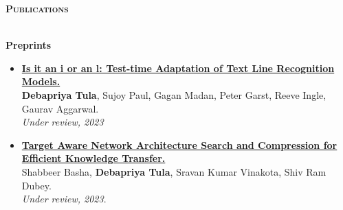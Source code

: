 \documentclass[10pt]{article}
\renewcommand{\section}[1]{
\bigskip
  \begin{Large}
  {\textsc{\textbf{#1}}}
  \end{Large}
  \hrulefill
  \medskip
  \\
}
\begin{document}
\section{Publications}
\label{sec:pubs}
\textbf{\large{Preprints}}\hfill
\begin{itemize}
    \item \href{https://arxiv.org/abs/2308.15037}{\textbf{Is it an i or an l: Test-time Adaptation of Text Line Recognition Models.}}\\
    \textbf{Debapriya Tula}, Sujoy Paul, Gagan Madan, Peter Garst, Reeve Ingle, Gaurav Aggarwal. \\
    \emph{Under review, 2023}
    
    \item \href{https://arxiv.org/abs/2205.05967}{\textbf{Target Aware Network Architecture Search and Compression for Efficient Knowledge Transfer.}}\\
    Shabbeer Basha, \textbf{Debapriya Tula}, Sravan Kumar Vinakota, Shiv Ram Dubey. \\
    \emph{Under review, 2023}.
\end{itemize}
\end{document}
